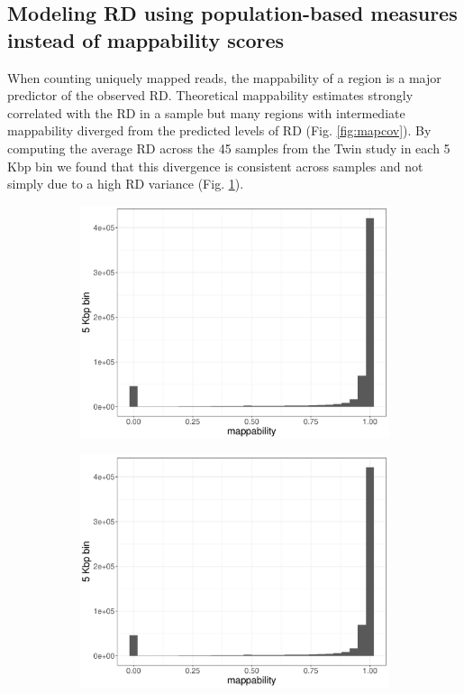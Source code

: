 \subsection*{Modeling RD using population-based measures instead of mappability scores}
When counting uniquely mapped reads, the mappability of a region is a major predictor of the observed RD.
Theoretical mappability estimates\cite{Derrien2012} strongly correlated with the RD in a sample but many regions with intermediate mappability diverged from the predicted levels of RD (Fig. \ref{fig:mapcov}).
By computing the average RD across the 45 samples from the Twin study in each 5 Kbp bin we found that this divergence is consistent across samples and not simply due to a high RD variance (Fig. \ref{fig:mapmean}).
\begin{figure}[htp]
  \begin{subfigure}[b]{.48\textwidth}
    \includegraphics[width=\linewidth, page=4]{figures/wgs-map-coverage-cohorts.pdf}
    \caption{}
    \label{fig:mapmean}
  \end{subfigure}
  \begin{subfigure}[b]{.48\textwidth}
    \includegraphics[width=\linewidth, page=5]{figures/wgs-map-coverage-cohorts.pdf}
    \caption{}
    \label{fig:znorm}
  \end{subfigure}


\end{figure}
